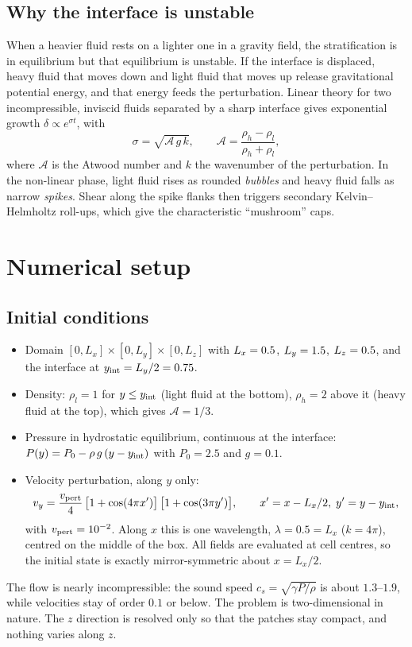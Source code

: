 \documentclass[11pt,a4paper]{article}
\begin{document}
\subsection{Why the interface is unstable}
When a heavier fluid rests on a lighter one in a gravity field, the stratification is in
equilibrium but that equilibrium is unstable. If the interface is displaced, heavy fluid that moves
down and light fluid that moves up release gravitational potential energy, and that energy feeds the
perturbation. Linear theory for two incompressible, inviscid fluids separated by a sharp interface
gives exponential growth $\delta \propto e^{\sigma t}$, with
\begin{equation}
\sigma = \sqrt{\mathcal{A}\,g\,k}, \qquad \mathcal{A} = \frac{\rho_h - \rho_l}{\rho_h + \rho_l},
\end{equation}
where $\mathcal{A}$ is the Atwood number and $k$ the wavenumber of the perturbation. In the
non-linear phase, light fluid rises as rounded \emph{bubbles} and heavy fluid falls as narrow
\emph{spikes}. Shear along the spike flanks then triggers secondary Kelvin--Helmholtz roll-ups,
which give the characteristic ``mushroom'' caps.

\section{Numerical setup}

\subsection{Initial conditions}
\begin{itemize}
\item Domain $[0,L_x]\times[0,L_y]\times[0,L_z]$ with $L_x = 0.5$, $L_y = 1.5$, $L_z = 0.5$, and the interface at
      $y_{\rm int} = L_y/2 = 0.75$.
\item Density: $\rho_l = 1$ for $y \le y_{\rm int}$ (light fluid at the bottom), $\rho_h = 2$ above it (heavy
      fluid at the top), which gives $\mathcal{A} = 1/3$.
\item Pressure in hydrostatic equilibrium, continuous at the interface:
      $P(y) = P_0 - \rho\,g\,(y - y_{\rm int})$ with $P_0 = 2.5$ and $g = 0.1$.
\item Velocity perturbation, along $y$ only:
      \begin{equation}
      v_y = \frac{v_{\rm pert}}{4}\,\big[1+\cos(4\pi x')\big]\,\big[1+\cos(3\pi y')\big],\qquad
      x' = x - L_x/2,\; y' = y - y_{\rm int},
      \end{equation}
      with $v_{\rm pert} = 10^{-2}$. Along $x$ this is one wavelength, $\lambda = 0.5 = L_x$
      ($k = 4\pi$), centred on the middle of the box. All fields are evaluated at cell centres, so
      the initial state is exactly mirror-symmetric about $x = L_x/2$.
\end{itemize}
The flow is nearly incompressible: the sound speed $c_s = \sqrt{\gamma P/\rho}$ is about $1.3$--$1.9$,
while velocities stay of order $0.1$ or below. The problem is two-dimensional in nature. The $z$
direction is resolved only so that the patches stay compact, and nothing varies along $z$.
\end{document}

